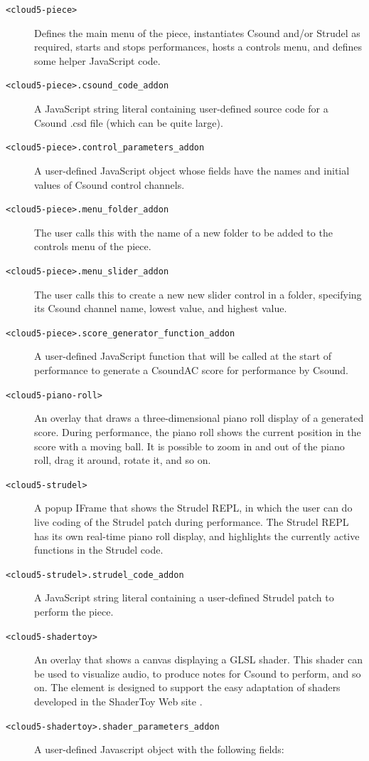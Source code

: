 \documentclass[runningheads,a4paper]{llncs}
\begin{document}
\begin{description}
\item[\texttt{<cloud5-piece>}] Defines the main menu of the piece, instantiates Csound and/or Strudel as required, starts and stops performances, hosts a controls menu, and defines some helper JavaScript code.
\item[\texttt{<cloud5-piece>.csound\_code\_addon}]  A JavaScript string literal containing user-defined source code for a Csound .csd file (which can be quite large).
\item[\texttt{<cloud5-piece>.control\_parameters\_addon}]  A user-defined JavaScript object whose fields have the names and initial values of Csound control channels.
\item[\texttt{<cloud5-piece>.menu\_folder\_addon}]  The user calls this with the name of a new folder to be added to the controls menu of the piece.
\item[\texttt{<cloud5-piece>.menu\_slider\_addon}]  The user calls this to create a new new slider control in a folder, specifying its Csound channel name, lowest value, and highest value.
\item[\texttt{<cloud5-piece>.score\_generator\_function\_addon}]  A user-defined JavaScript function that will be called at the start of performance to generate a CsoundAC score for performance by Csound. 
\item[\texttt{<cloud5-piano-roll>}] An overlay that draws a three-dimensional piano roll display of a generated score. During performance, the piano roll shows the current position in the score with a moving ball. It is possible to zoom in and out of the piano roll, drag it around, rotate it, and so on.
\item[\texttt{<cloud5-strudel>}] A popup IFrame that shows the Strudel REPL, in which the user can do live coding of the Strudel patch during performance. The Strudel REPL has its own real-time piano roll display, and highlights the currently active functions in the Strudel code.
\item[\texttt{<cloud5-strudel>.strudel\_code\_addon}] A JavaScript string literal containing a user-defined  Strudel patch to perform the piece.
\item[\texttt{<cloud5-shadertoy>}] An overlay that shows a canvas displaying a GLSL shader. This shader can be used to visualize audio, to produce notes for Csound to perform, and so on. The element is designed to support the easy adaptation of shaders developed in the ShaderToy Web site \cite{shadertoy}.
\item[\texttt{<cloud5-shadertoy>.shader\_parameters\_addon}] A user-defined Javascript object with the following fields:

\end{description}
\end{document}
